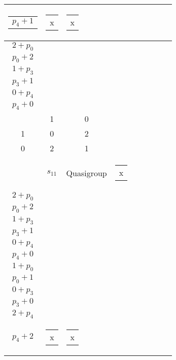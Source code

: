 \begin{longtable}{|c|c|c|c|c|c|c|c|c|}
\begin{tabular}{c}
    \( p_{4} + 1 \)
\end{tabular} & \begin{tabular}{c}
    x
\end{tabular} & \begin{tabular}{c}
    x
\end{tabular} & \begin{tabular}{c}
    \\\hline
    \( 2 + p_{0} \)\\\hline
    \( p_{0} + 2 \)\\\hline
    \( 1 + p_{3} \)\\\hline
    \( p_{3} + 1 \)\\\hline
    \( 0 + p_{4} \)\\\hline
    \( p_{4} + 0 \)
\end{tabular}\\\hline
    \( \begin{smallmatrix}
    2 & 1 & 0\\
    1 & 0 & 2\\
    0 & 2 & 1\\
\end{smallmatrix} \) & \( s_{11} \) & Quasigroup & \begin{tabular}{c}
    x
\end{tabular} & \begin{tabular}{c}
    \\\hline
    \( 2 + p_{0} \)\\\hline
    \( p_{0} + 2 \)\\\hline
    \( 1 + p_{3} \)\\\hline
    \( p_{3} + 1 \)\\\hline
    \( 0 + p_{4} \)\\\hline
    \( p_{4} + 0 \)
\end{tabular} & \begin{tabular}{c}
    \\\hline
    \( 1 + p_{0} \)\\\hline
    \( p_{0} + 1 \)\\\hline
    \( 0 + p_{3} \)\\\hline
    \( p_{3} + 0 \)\\\hline
    \( 2 + p_{4} \)\\\hline
    \( p_{4} + 2 \)
\end{tabular} & \begin{tabular}{c}
    x
\end{tabular} & \begin{tabular}{c}
    x
\end{tabular} & \begin{tabular}{c}

\end{tabular}
\end{longtable}
